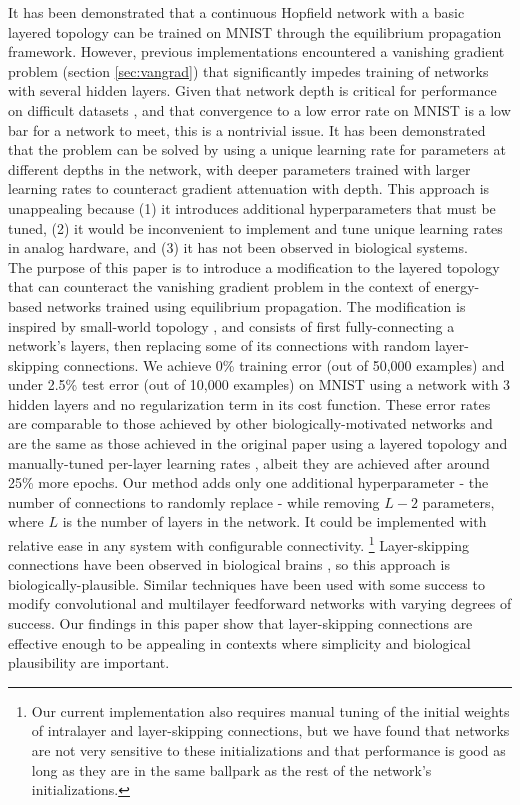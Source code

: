 \documentclass[format=sigconf]{acmart}
\newcommand{\npar}{\\\indent}
\begin{document}
It has been demonstrated \cite{scellier17} that a continuous Hopfield network with a basic layered topology can be trained on MNIST \cite{mnist1998} through the equilibrium propagation framework. However, previous implementations encountered a vanishing gradient problem (section \ref{sec:vangrad}) that significantly impedes training of networks with several hidden layers. Given that network depth is critical for performance on difficult datasets \cite{simonyan2014, srivastava2015tvdn}, and that convergence to a low error rate on MNIST is a low bar for a network to meet, this is a nontrivial issue. It has been demonstrated \cite{scellier17} that the problem can be solved by using a unique learning rate for parameters at different depths in the network, with deeper parameters trained with larger learning rates to counteract gradient attenuation with depth. This approach is unappealing because (1) it introduces additional hyperparameters that must be tuned, (2) it would be inconvenient to implement and tune unique learning rates in analog hardware, and (3) it has not been observed in biological systems.
\npar
The purpose of this paper is to introduce a modification to the layered topology that can counteract the vanishing gradient problem in the context of energy-based networks trained using equilibrium propagation. The modification is inspired by small-world topology \cite{watts98}, and consists of first fully-connecting a network's layers, then replacing some of its connections with random layer-skipping connections. We achieve 0\% training error (out of 50,000 examples) and under 2.5\% test error (out of 10,000 examples) on MNIST using a network with 3 hidden layers and no regularization term in its cost function. These error rates are comparable to those achieved by other biologically-motivated networks \cite{bartunov2018} and are the same as those achieved in the original paper using a layered topology and manually-tuned per-layer learning rates \cite{scellier17}, albeit they are achieved after around 25\% more epochs. Our method adds only one additional hyperparameter - the number of connections to randomly replace - while removing $L-2$ parameters, where $L$ is the number of layers in the network. It could be implemented with relative ease in any system with configurable connectivity.
\footnote{Our current implementation also requires manual tuning of the initial weights of intralayer and layer-skipping connections, but we have found that networks are not very sensitive to these initializations and that performance is good as long as they are in the same ballpark as the rest of the network's initializations.} Layer-skipping connections have been observed in biological brains \cite{bullmore2009}, so this approach is biologically-plausible. Similar techniques have been used with some success to modify convolutional \cite{he2015, srivastava2015} and multilayer feedforward \cite{xiaohu2011, krishnan2019} networks with varying degrees of success. Our findings in this paper show that layer-skipping connections are effective enough to be appealing in contexts where simplicity and biological plausibility are important.
\end{document}
